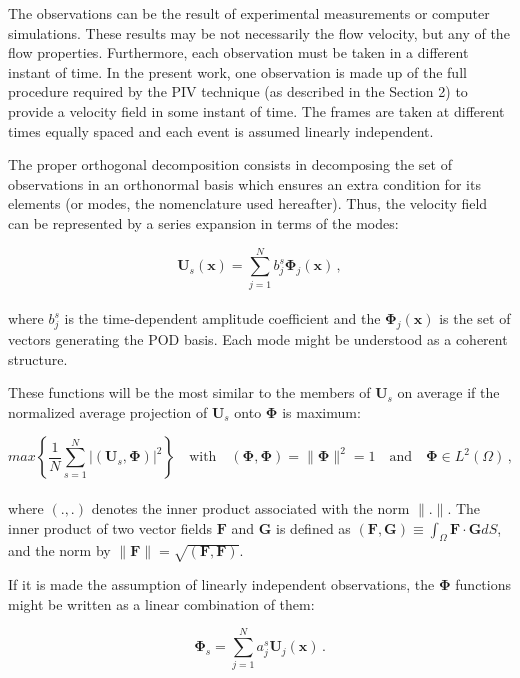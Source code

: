 \documentclass[10pt,fleqn,a4paper]{article}
\newcommand{\bv}[1]{\mathbf{#1}}
\begin{document}
The observations can be the result of experimental measurements or computer simulations. These results may be not necessarily the flow velocity, but any of the flow properties. Furthermore, each observation must be taken in a different instant of time. In the present work, one observation is made up of the full procedure required by the PIV technique (as described in the Section 2) to provide a velocity field in some instant of time. The frames are taken at different times equally spaced and each event is assumed linearly independent.

The proper orthogonal decomposition consists in decomposing the set of observations in an orthonormal basis which ensures an extra condition for its elements (or modes, the nomenclature used hereafter). Thus, the velocity field can be represented by a series expansion in terms of the modes:


\begin{equation}\label{eq: Us}
 \bv{U}_s (\bv{x}) = \sum_{j=1}^{N} b^{s}_{j} \bv{\Phi}_{j}(\bv{x}) \,,
\end{equation}
\\
where $b^{s}_{j}$ is the time-dependent amplitude coefficient and the $\bv{\Phi}_{j}(\bv{x})$ is the set of vectors generating the POD basis.  
Each mode might be understood as a coherent structure.

These functions will be the most similar to the members of $\bv{U}_{s}$ on average if the normalized average projection of $\bv{U}_{s}$ onto $\bv{\Phi}$ is maximum:


\begin{equation}\label{eq: max-cond}
max \left \lbrace \frac{1}{N} \sum_{s=1}^{N} | \left(\bv{U}_{s} , \bv{\Phi}\right) |^2 \right \rbrace \quad \text{with} \quad (\bv{\Phi},\bv{\Phi}) =  \parallel \bv{\Phi} \parallel^2 = 1 \quad \text{and} \quad \bv{\Phi} \in L^2 (\Omega) \,,
\end{equation}
\\
where $(.,.)$ denotes the inner product associated with the norm $\parallel . \parallel$. The inner product of two vector fields $\bv{F}$ and $\bv{G}$ is defined as $(\bv{F},\bv{G}) \equiv \int_{\Omega} {\bv{F} \cdot \bv{G}} dS$, and the norm by $\parallel \bv{F} \parallel = \sqrt{(\bv{F},\bv{F})}$.


If it is made the assumption of linearly independent observations, the $\bv{\Phi}$ functions might be written as a linear combination of them:


\begin{equation}\label{eq: phifunctions}
 \bv{\Phi}_s = \sum_{j=1}^{N} a^{s}_{j} \bv{U}_{j}(\bv{x}) \,.
\end{equation}
\end{document}
